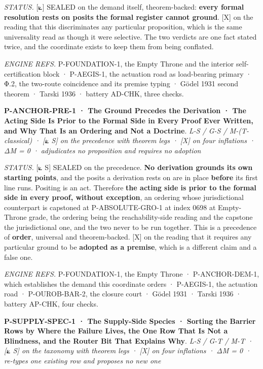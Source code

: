 \documentclass[10pt,twocolumn]{article}
\begin{document}
\emph{STATUS.} {[}⟀{]} SEALED on the demand itself, theorem-backed:
\textbf{every formal resolution rests on posits the formal register
cannot ground}. {[}X{]} on the reading that this discriminates any
particular proposition, which is the same universality read as though it
were selective. The two verdicts are one fact stated twice, and the
coordinate exists to keep them from being conflated.

\emph{ENGINE REFS.} P-FOUNDATION-1, the Empty Throne and the interior
self-certification block · P-AEGIS-1, the actuation road as load-bearing
primary · Φ.2, the two-route coincidence and its premise typing · Gödel
1931 second theorem · Tarski 1936 · battery AD-CHK, three checks.

\textbf{P-ANCHOR-PRE-1 · The Ground Precedes the Derivation · The Acting
Side Is Prior to the Formal Side in Every Proof Ever Written, and Why
That Is an Ordering and Not a Doctrine}. \emph{L-S / G-S /
M-(T-classical) · {[}⟀ S{]} on the precedence with theorem legs ·
{[}X{]} on four inflations · ΔM = 0 · adjudicates no proposition and
requires no adoption}

\emph{STATUS.} {[}⟀ S{]} SEALED on the precedence. \textbf{No derivation
grounds its own starting points}, and the posits a derivation rests on
are in place \textbf{before} its first line runs. Positing is an act.
Therefore \textbf{the acting side is prior to the formal side in every
proof, without exception}, an ordering whose jurisdictional counterpart
is capstoned at P-ABSOLUTE-GRO-1 at index 0698 at Empty-Throne grade,
the ordering being the reachability-side reading and the capstone the
jurisdictional one, and the two never to be run together. This is a
precedence of \textbf{order}, universal and theorem-backed. {[}X{]} on
the reading that it requires any particular ground to be \textbf{adopted
as a premise}, which is a different claim and a false one.

\emph{ENGINE REFS.} P-FOUNDATION-1, the Empty Throne · P-ANCHOR-DEM-1,
which establishes the demand this coordinate orders · P-AEGIS-1, the
actuation road · P-OUROB-BAR-2, the closure court · Gödel 1931 · Tarski
1936 · battery AP-CHK, four checks.

\textbf{P-SUPPLY-SPEC-1 · The Supply-Side Species · Sorting the Barrier
Rows by Where the Failure Lives, the One Row That Is Not a Blindness,
and the Router Bit That Explains Why}. \emph{L-S / G-T / M-T · {[}⟀ S{]}
on the taxonomy with theorem legs · {[}X{]} on four inflations · ΔM = 0
· re-types one existing row and proposes no new one}
\end{document}
